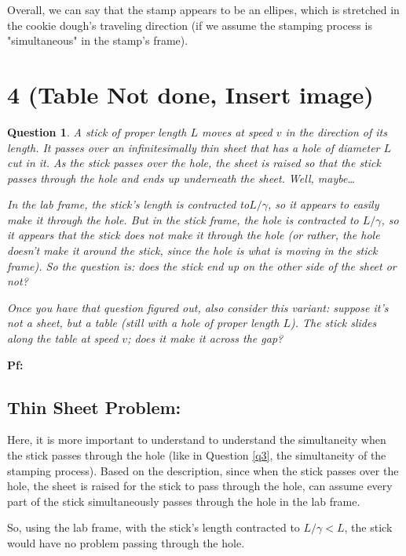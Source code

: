 \documentclass{article}
\newtheorem{question}{Question}
\begin{document}
\hfil

Overall, we can say that the stamp appears to be an ellipes, which is stretched in the cookie dough's traveling direction (if we assume the stamping process is "simultaneous" in the stamp's frame).

\break

\section*{4 (Table Not done, Insert image)}
\begin{question}\label{q4}
    A stick of proper length $L$ moves at speed $v$ in the direction of its length. It passes over an infinitesimally thin sheet that has a hole of diameter $L$ cut in it. As the stick passes over the hole, the sheet is raised so that the stick passes through the hole and ends up underneath the sheet. Well, maybe\dots

    In the lab frame, the stick's length is contracted to$L/\gamma$, so it appears to easily make it through the hole. But in the stick frame, the \emph{hole} is contracted to $L/\gamma$, so it appears that the stick does \emph{not} make it through the hole (or rather, the hole doesn't make it around the stick, since the hole is what is moving in the stick frame). So the question is: does the stick end up on the other side of the sheet or not?

    Once you have that question figured out, also consider this variant: suppose it's not a sheet, but a table (still with a hole of proper length $L$). The stick slides along the table at speed $v$; does it make it across the gap?
\end{question}

\textbf{Pf:}

\subsection*{Thin Sheet Problem:}
Here, it is more important to understand to understand the simultaneity when the stick passes through the hole (like in Question \ref{q3}, the simultaneity of the stamping process). Based on the description, since when the stick passes over the hole, the sheet is raised for the stick to pass through the hole, can assume every part of the stick simultaneously passes through the hole in the lab frame.

So, using the lab frame, with the stick's length contracted to $L/\gamma<L$, the stick would have no problem passing through the hole.
\end{document}
